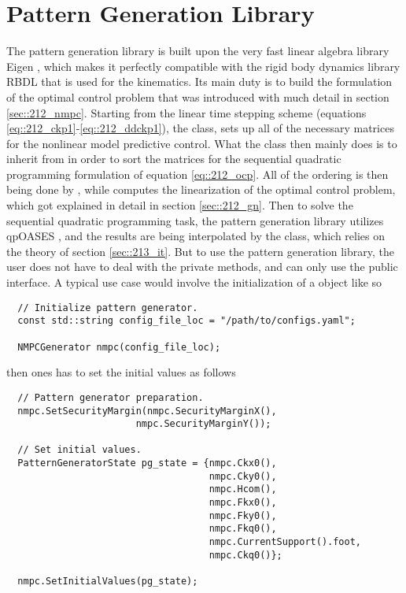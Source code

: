 \FloatBarrier
\section{Pattern Generation Library}
\label{sec::32_pg}
The pattern generation library is built upon the very fast linear algebra library Eigen \cite{eigenweb}, which makes it perfectly compatible with the rigid body dynamics library RBDL \cite{felis2017rbdl} that is used for the kinematics. Its main duty is to build the formulation of the optimal control problem that was introduced with much detail in section \ref{sec::212_nmpc}. Starting from the linear time stepping scheme (equations \ref{eq::212_ckp1}-\ref{eq::212_ddckp1}), the  class, sets up all of the necessary matrices for the nonlinear model predictive control. What the  class then mainly does is to inherit from  in order to sort the matrices for the sequential quadratic programming formulation of equation \ref{eq::212_ocp}. All of the ordering is then being done by , while  computes the linearization of the optimal control problem, which got explained in detail in section \ref{sec::212_gn}. Then to solve the sequential quadratic programming task, the pattern generation library utilizes qpOASES \cite{ferreau2014qpoases}, and the results are being interpolated by the  class, which relies on the theory of section \ref{sec::213_it}. But to use the pattern generation library, the user does not have to deal with the private methods, and can only use the public interface. A typical use case would involve the initialization of a  object like so
\begin{verbatim}
  // Initialize pattern generator.
  const std::string config_file_loc = "/path/to/configs.yaml";

  NMPCGenerator nmpc(config_file_loc);
\end{verbatim} 
then ones has to set the initial values as follows
\begin{verbatim}
  // Pattern generator preparation.
  nmpc.SetSecurityMargin(nmpc.SecurityMarginX(), 
  		               nmpc.SecurityMarginY());
	
  // Set initial values.
  PatternGeneratorState pg_state = {nmpc.Ckx0(),
                                    nmpc.Cky0(),
                                    nmpc.Hcom(),
                                    nmpc.Fkx0(),
                                    nmpc.Fky0(),
                                    nmpc.Fkq0(),
                                    nmpc.CurrentSupport().foot,
                                    nmpc.Ckq0()};

  nmpc.SetInitialValues(pg_state);
\end{verbatim}

